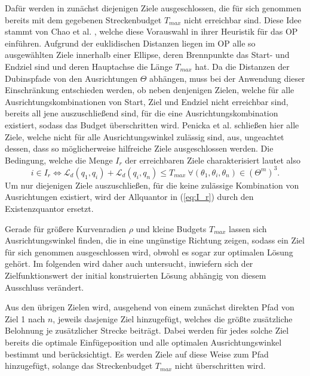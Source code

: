 \documentclass[12pt,a4paper,twoside]{article}
\theoremstyle{definition}
\numberwithin{equation}{section}
\begin{document}
Dafür werden in \cite{R.Penicka.2017} zunächst diejenigen Ziele ausgeschlossen, die für sich genommen bereits mit dem gegebenen Streckenbudget $T_{max}$ nicht erreichbar sind. Diese Idee stammt von Chao et al. \cite{Chao.1996b}, welche diese Vorauswahl in ihrer Heuristik für das OP einführen. Aufgrund der euklidischen Distanzen liegen im OP alle so ausgewählten Ziele innerhalb einer Ellipse, deren Brennpunkte das Start- und Endziel sind und deren Hauptachse die Länge $T_{max}$ hat. Da die Distanzen der Dubinspfade von den Ausrichtungen $\Theta$ abhängen, muss bei der Anwendung dieser Einschränkung entschieden werden, ob neben denjenigen Zielen, welche für alle Ausrichtungskombinationen von Start, Ziel und Endziel nicht erreichbar sind, bereits all jene auszuschließend sind, für die eine Ausrichtungskombination existiert, sodass das Budget überschritten wird. Penicka et al. \cite{R.Penicka.2017}  schließen hier alle Ziele, welche nicht für alle Ausrichtungswinkel zulässig sind, aus, ungeachtet dessen, dass so möglicherweise hilfreiche Ziele ausgeschlossen werden. Die Bedingung, welche die Menge $I_r$ der erreichbaren Ziele charakterisiert lautet also
\begin{equation*}\label{eq:I_r}
	i \in I_r \Leftrightarrow \mathcal{L}_d(q_{1},q_{i}) + \mathcal{L}_d(q_{i},q_{n}) \leq    T_{max} \ \forall (\theta_1,\theta_i,\theta_{n}) \in (\Theta^m)^3.
\end{equation*}
Um nur diejenigen Ziele auszuschließen, für die keine zulässige Kombination von Ausrichtungen existiert, wird der Allquantor in (\ref{eq:I_r}) durch den Existenzquantor ersetzt.

Gerade für größere Kurvenradien $\rho$ und kleine Budgets $T_{max}$ lassen sich Ausrichtungswinkel finden, die in eine ungünstige Richtung zeigen, sodass ein Ziel für sich genommen ausgeschlossen wird, obwohl es sogar zur optimalen Lösung gehört. Im folgenden wird daher auch untersucht, inwiefern sich der Zielfunktionswert der initial konstruierten Lösung abhängig von diesem Ausschluss verändert.

Aus den übrigen Zielen wird, ausgehend von einem zunächst direkten Pfad von Ziel 1 nach $n$, jeweils dasjenige Ziel hinzugefügt, welches die größte zusätzliche Belohnung je zusätzlicher Strecke beiträgt. Dabei werden für jedes solche Ziel bereits die optimale Einfügeposition und alle optimalen Ausrichtungswinkel bestimmt und berücksichtigt. Es werden Ziele auf diese Weise zum Pfad hinzugefügt, solange das Streckenbudget $T_{max}$  nicht überschritten wird.\\
\end{document}
